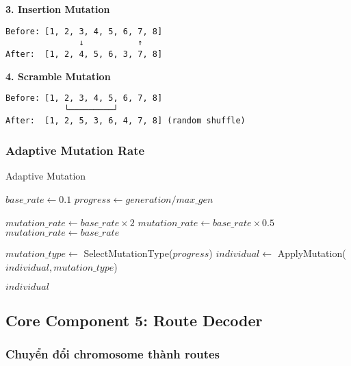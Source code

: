 \documentclass[12pt,a4paper]{article}
\begin{document}
\textbf{3. Insertion Mutation}
\begin{verbatim}
Before: [1, 2, 3, 4, 5, 6, 7, 8]
               ↓           ↑
After:  [1, 2, 4, 5, 6, 3, 7, 8]
\end{verbatim}

\textbf{4. Scramble Mutation}
\begin{verbatim}
Before: [1, 2, 3, 4, 5, 6, 7, 8]
            └─────────┘
After:  [1, 2, 5, 3, 6, 4, 7, 8] (random shuffle)
\end{verbatim}

\subsubsection{Adaptive Mutation Rate}

\begin{algorithm}
\caption{Adaptive Mutation}
\begin{algorithmic}[1]
    \State $base\_rate \gets 0.1$
    \State $progress \gets generation / max\_gen$
    
        \State $mutation\_rate \gets base\_rate \times 2$
        \State $mutation\_rate \gets base\_rate \times 0.5$ 
    \Else
        \State $mutation\_rate \gets base\_rate$
    \EndIf
    
        \State $mutation\_type \gets$ SelectMutationType($progress$)
        \State $individual \gets$ ApplyMutation($individual, mutation\_type$)
    \EndIf
    
    \State \Return $individual$
\EndFunction
\end{algorithmic}
\end{algorithm}

\subsection{Core Component 5: Route Decoder}

\subsubsection{Chuyển đổi chromosome thành routes}
\end{document}
